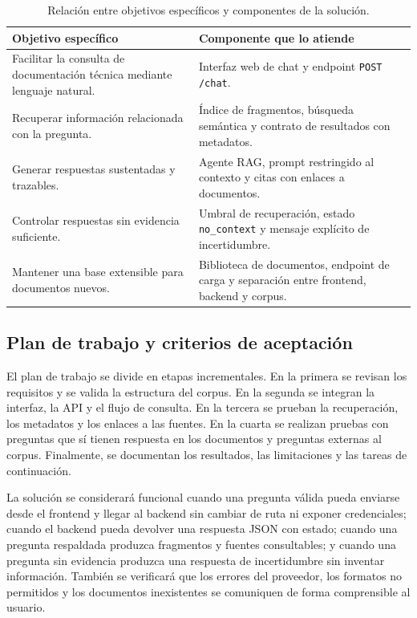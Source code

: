 \begin{table}[htbp]
\centering
\caption{Relación entre objetivos específicos y componentes de la solución.}
\label{tab:objetivos_propuesta}
\begin{tabular}{p{}p{}}
\toprule
\textbf{Objetivo específico} & \textbf{Componente que lo atiende}\\
\midrule
Facilitar la consulta de documentación técnica mediante lenguaje natural. & Interfaz web de chat y endpoint \texttt{POST /chat}.\\
Recuperar información relacionada con la pregunta. & Índice de fragmentos, búsqueda semántica y contrato de resultados con metadatos.\\
Generar respuestas sustentadas y trazables. & Agente RAG, prompt restringido al contexto y citas con enlaces a documentos.\\
Controlar respuestas sin evidencia suficiente. & Umbral de recuperación, estado \texttt{no\_context} y mensaje explícito de incertidumbre.\\
Mantener una base extensible para documentos nuevos. & Biblioteca de documentos, endpoint de carga y separación entre frontend, backend y corpus.\\
\bottomrule
\end{tabular}
\end{table}

\subsection{Plan de trabajo y criterios de aceptación}

El plan de trabajo se divide en etapas incrementales. En la primera se revisan los requisitos y se valida la estructura del corpus. En la segunda se integran la interfaz, la API y el flujo de consulta. En la tercera se prueban la recuperación, los metadatos y los enlaces a las fuentes. En la cuarta se realizan pruebas con preguntas que sí tienen respuesta en los documentos y preguntas externas al corpus. Finalmente, se documentan los resultados, las limitaciones y las tareas de continuación.

La solución se considerará funcional cuando una pregunta válida pueda enviarse desde el frontend y llegar al backend sin cambiar de ruta ni exponer credenciales; cuando el backend pueda devolver una respuesta JSON con estado; cuando una pregunta respaldada produzca fragmentos y fuentes consultables; y cuando una pregunta sin evidencia produzca una respuesta de incertidumbre sin inventar información. También se verificará que los errores del proveedor, los formatos no permitidos y los documentos inexistentes se comuniquen de forma comprensible al usuario.

